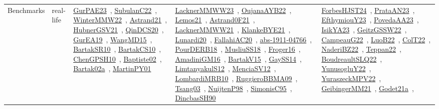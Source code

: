 {\begin{longtable}{lp{3cm}>{\raggedright\arraybackslash}p{6cm}>{\raggedright\arraybackslash}p{6cm}>{\raggedright\arraybackslash}p{8cm}}
Benchmarks & real-life & \href{works/GurPAE23.pdf}{GurPAE23}~\cite{GurPAE23}, \href{works/SubulanC22.pdf}{SubulanC22}~\cite{SubulanC22}, \href{works/WinterMMW22.pdf}{WinterMMW22}~\cite{WinterMMW22}, \href{works/Astrand21.pdf}{Astrand21}~\cite{Astrand21}, \href{works/HubnerGSV21.pdf}{HubnerGSV21}~\cite{HubnerGSV21}, \href{works/QinDCS20.pdf}{QinDCS20}~\cite{QinDCS20}, \href{works/GurEA19.pdf}{GurEA19}~\cite{GurEA19}, \href{works/WangMD15.pdf}{WangMD15}~\cite{WangMD15}, \href{works/BartakSR10.pdf}{BartakSR10}~\cite{BartakSR10}, \href{works/BartakCS10.pdf}{BartakCS10}~\cite{BartakCS10}, \href{works/ChenGPSH10.pdf}{ChenGPSH10}~\cite{ChenGPSH10}, \href{works/Baptiste02.pdf}{Baptiste02}~\cite{Baptiste02}, \href{works/Bartak02a.pdf}{Bartak02a}~\cite{Bartak02a}, \href{works/MartinPY01.pdf}{MartinPY01}~\cite{MartinPY01} & \href{works/LacknerMMWW23.pdf}{LacknerMMWW23}~\cite{LacknerMMWW23}, \href{works/OujanaAYB22.pdf}{OujanaAYB22}~\cite{OujanaAYB22}, \href{works/Lemos21.pdf}{Lemos21}~\cite{Lemos21}, \href{works/Astrand0F21.pdf}{Astrand0F21}~\cite{Astrand0F21}, \href{works/LacknerMMWW21.pdf}{LacknerMMWW21}~\cite{LacknerMMWW21}, \href{works/KlankeBYE21.pdf}{KlankeBYE21}~\cite{KlankeBYE21}, \href{works/Lunardi20.pdf}{Lunardi20}~\cite{Lunardi20}, \href{works/FallahiAC20.pdf}{FallahiAC20}~\cite{FallahiAC20}, \href{works/abs-1911-04766.pdf}{abs-1911-04766}~\cite{abs-1911-04766}, \href{works/PourDERB18.pdf}{PourDERB18}~\cite{PourDERB18}, \href{works/MusliuSS18.pdf}{MusliuSS18}~\cite{MusliuSS18}, \href{works/Froger16.pdf}{Froger16}~\cite{Froger16}, \href{works/AmadiniGM16.pdf}{AmadiniGM16}~\cite{AmadiniGM16}, \href{works/BartakV15.pdf}{BartakV15}~\cite{BartakV15}, \href{works/GaySS14.pdf}{GaySS14}~\cite{GaySS14}, \href{works/LimtanyakulS12.pdf}{LimtanyakulS12}~\cite{LimtanyakulS12}, \href{works/MenciaSV12.pdf}{MenciaSV12}~\cite{MenciaSV12}, \href{works/LombardiMRB10.pdf}{LombardiMRB10}~\cite{LombardiMRB10}, \href{works/RuggieroBBMA09.pdf}{RuggieroBBMA09}~\cite{RuggieroBBMA09}, \href{works/Tsang03.pdf}{Tsang03}~\cite{Tsang03}, \href{works/NuijtenP98.pdf}{NuijtenP98}~\cite{NuijtenP98}, \href{works/SimonisC95.pdf}{SimonisC95}~\cite{SimonisC95}, \href{works/DincbasSH90.pdf}{DincbasSH90}~\cite{DincbasSH90} & \href{works/ForbesHJST24.pdf}{ForbesHJST24}~\cite{ForbesHJST24}, \href{works/PrataAN23.pdf}{PrataAN23}~\cite{PrataAN23}, \href{works/EfthymiouY23.pdf}{EfthymiouY23}~\cite{EfthymiouY23}, \href{works/PovedaAA23.pdf}{PovedaAA23}~\cite{PovedaAA23}, \href{works/IsikYA23.pdf}{IsikYA23}~\cite{IsikYA23}, \href{works/GeitzGSSW22.pdf}{GeitzGSSW22}~\cite{GeitzGSSW22}, \href{works/CampeauG22.pdf}{CampeauG22}~\cite{CampeauG22}, \href{works/LuoB22.pdf}{LuoB22}~\cite{LuoB22}, \href{works/ColT22.pdf}{ColT22}~\cite{ColT22}, \href{works/NaderiBZ22.pdf}{NaderiBZ22}~\cite{NaderiBZ22}, \href{works/Teppan22.pdf}{Teppan22}~\cite{Teppan22}, \href{works/BoudreaultSLQ22.pdf}{BoudreaultSLQ22}~\cite{BoudreaultSLQ22}, \href{works/YunusogluY22.pdf}{YunusogluY22}~\cite{YunusogluY22}, \href{works/YuraszeckMPV22.pdf}{YuraszeckMPV22}~\cite{YuraszeckMPV22}, \href{works/GeibingerMM21.pdf}{GeibingerMM21}~\cite{GeibingerMM21}, \href{works/Godet21a.pdf}{Godet21a}~\cite{Godet21a}, 
\end{longtable}}
